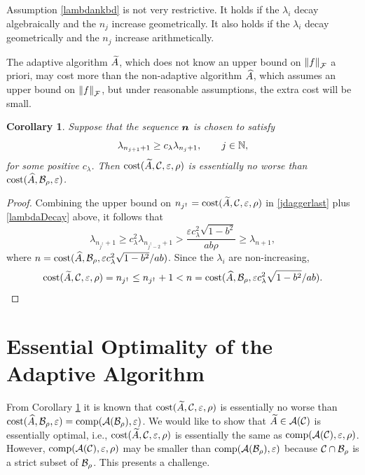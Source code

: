 \documentclass[final]{elsarticle}
\newtheorem{cor}[theorem]{Corollary}
\theoremstyle{definition}
\theoremstyle{remark}
\begin{document}
Assumption \eqref{lambdankbd} is not very restrictive.  It holds if the $\lambda_i$ decay algebraically and the $n_j$ increase geometrically.  It also holds if the $\lambda_i$ decay geometrically and the $n_j$ increase arithmetically.

The adaptive algorithm $\tA$, which does not know an upper bound on $\norm[\cf]{f}$ a priori, may cost more than the non-adaptive algorithm $\hA$, which assumes an upper bound on $\norm[\cf]{f}$, but under reasonable assumptions, the extra cost will be small.

\begin{cor} \label{cor:tAsameCosthA} Suppose that the sequence $\vn$ is chosen to satisfy
\begin{equation} \label{lambdaDecay}
\lambda_{n_{j+1}+1} \ge c_\lambda \lambda_{n_j+1}, \qquad j \in \naturals, 
\end{equation}
for some positive $c_\lambda$.  Then $\cost(\tA,\cc, \varepsilon,\rho)$ is essentially no worse than \linebreak[4]
$\cost(\hA,\cb_{\rho},\varepsilon)$. 


\end{cor}

\begin{proof}
Combining the upper bound on $n_{j^\dagger} = \cost(\tA,\cc,\varepsilon,\rho)$ in \eqref{jdaggerlast} plus  \eqref{lambdaDecay} above, it follows that
\begin{equation*}
\lambda_{n_{j^\dagger}+1} \ge c_{\lambda}^2 \lambda_{n_{j^\dagger-2}+1} > \frac{\varepsilon c_{\lambda}^2\sqrt{1 - b^2}}{ab \rho} \ge \lambda_{n+1},
\end{equation*}
where $n = \cost(\hA,\cb_{\rho},\varepsilon c_{\lambda}^2\sqrt{1 - b^2}/ab)$.
Since the $\lambda_i$ are non-increasing,
\begin{equation*}
\cost(\tA,\cc,\varepsilon,\rho) = n_{j^\dagger} \le n_{j^\dagger}+1 < n = \cost(\hA,\cb_{\rho},\varepsilon c_{\lambda}^2\sqrt{1 - b^2}/ab).
\end{equation*}
\end{proof}


\section{Essential Optimality of the Adaptive Algorithm} \label{sec:opt}

From Corollary \ref{cor:tAsameCosthA} it is known that $\cost(\tA,\cc, \varepsilon,\rho)$ is essentially no worse than
$\cost(\hA,\cb_{\rho},\varepsilon) = \comp(\ca(\cb_{\rho}),\varepsilon)$.  We would like to show that $\tA \in \ca(\cc)$ is  essentially optimal, i.e., $\cost(\tA,\cc, \varepsilon,\rho)$ is essentially the same as  $\comp(\ca(\cc),\varepsilon,\rho)$.  However,  $\comp(\ca(\cc),\varepsilon,\rho)$ may be smaller than $\comp(\ca(\cb_{\rho}),\varepsilon)$ because $\cc \cap \cb_\rho$ is a strict subset of  $ \cb_\rho$.  This presents a challenge.
\end{document}
